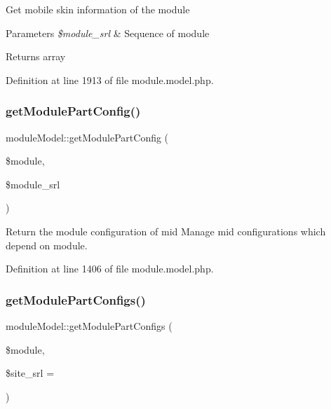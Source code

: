 Get mobile skin information of the module 
\begin{DoxyParams}{Parameters}
{\em \$module\+\_\+srl} & Sequence of module \\
\hline
\end{DoxyParams}
\begin{DoxyReturn}{Returns}
array 
\end{DoxyReturn}


Definition at line 1913 of file module.\+model.\+php.

\mbox{\label{classmoduleModel_acfd93d46c26d88c3833b0801085e69ba}} 
\subsubsection{\texorpdfstring{get\+Module\+Part\+Config()}{getModulePartConfig()}}
{\footnotesize\ttfamily module\+Model\+::get\+Module\+Part\+Config (\begin{DoxyParamCaption}\item[{}]{\$module,  }\item[{}]{\$module\+\_\+srl }\end{DoxyParamCaption})}



Return the module configuration of mid Manage mid configurations which depend on module. 



Definition at line 1406 of file module.\+model.\+php.

\mbox{\label{classmoduleModel_a3e50f170f709853c8adf5c8f759e08ca}} 
\subsubsection{\texorpdfstring{get\+Module\+Part\+Configs()}{getModulePartConfigs()}}
{\footnotesize\ttfamily module\+Model\+::get\+Module\+Part\+Configs (\begin{DoxyParamCaption}\item[{}]{\$module,  }\item[{}]{\$site\+\_\+srl = {} }\end{DoxyParamCaption})}




